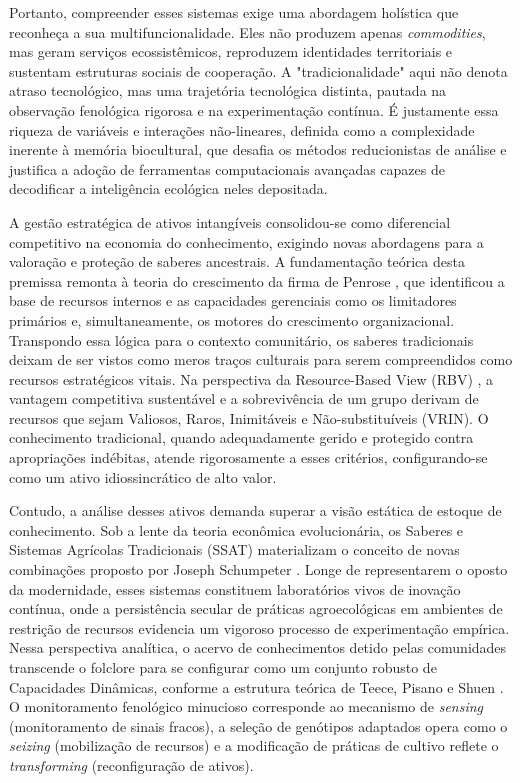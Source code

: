 Portanto, compreender esses sistemas exige uma abordagem holística que reconheça a sua multifuncionalidade. Eles não produzem apenas \textit{commodities}, mas geram serviços ecossistêmicos, reproduzem identidades territoriais e sustentam estruturas sociais de cooperação. A "tradicionalidade" aqui não denota atraso tecnológico, mas uma trajetória tecnológica distinta, pautada na observação fenológica rigorosa e na experimentação contínua. É justamente essa riqueza de variáveis e interações não-lineares, definida como a complexidade inerente à memória biocultural, que desafia os métodos reducionistas de análise e justifica a adoção de ferramentas computacionais avançadas capazes de decodificar a inteligência ecológica neles depositada.

A gestão estratégica de ativos intangíveis consolidou-se como diferencial competitivo na economia do conhecimento, exigindo novas abordagens para a valoração e proteção de saberes ancestrais. A fundamentação teórica desta premissa remonta à teoria do crescimento da firma de Penrose \cite{Penrose1959}, que identificou a base de recursos internos e as capacidades gerenciais como os limitadores primários e, simultaneamente, os motores do crescimento organizacional. Transpondo essa lógica para o contexto comunitário, os saberes tradicionais deixam de ser vistos como meros traços culturais para serem compreendidos como recursos estratégicos vitais. Na perspectiva da Resource-Based View (RBV) \cite{Barney1991}, a vantagem competitiva sustentável e a sobrevivência de um grupo derivam de recursos que sejam Valiosos, Raros, Inimitáveis e Não-substituíveis (VRIN). O conhecimento tradicional, quando adequadamente gerido e protegido contra apropriações indébitas, atende rigorosamente a esses critérios, configurando-se como um ativo idiossincrático de alto valor.

Contudo, a análise desses ativos demanda superar a visão estática de estoque de conhecimento. Sob a lente da teoria econômica evolucionária, os Saberes e Sistemas Agrícolas Tradicionais (SSAT) materializam o conceito de novas combinações proposto por Joseph Schumpeter \cite{Schumpeter1934}. Longe de representarem o oposto da modernidade, esses sistemas constituem laboratórios vivos de inovação contínua, onde a persistência secular de práticas agroecológicas em ambientes de restrição de recursos evidencia um vigoroso processo de experimentação empírica. Nessa perspectiva analítica, o acervo de conhecimentos detido pelas comunidades transcende o folclore para se configurar como um conjunto robusto de Capacidades Dinâmicas, conforme a estrutura teórica de Teece, Pisano e Shuen \cite{Teece1997}. O monitoramento fenológico minucioso corresponde ao mecanismo de \textit{sensing} (monitoramento de sinais fracos), a seleção de genótipos adaptados opera como o \textit{seizing} (mobilização de recursos) e a modificação de práticas de cultivo reflete o \textit{transforming} (reconfiguração de ativos).

